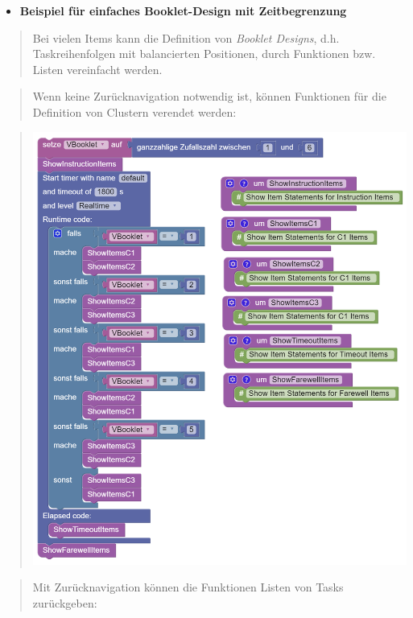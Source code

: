 \documentclass[
  letterpaper,
  DIV=11]{scrreprt}
\providecommand{\tightlist}{%
  \setlength{\itemsep}{0pt}\setlength{\parskip}{0pt}}\usepackage{longtable,booktabs,array}
\begin{document}
\begin{tcolorbox}
\begin{itemize}
\tightlist
\item
  \textbf{Beispiel für einfaches Booklet-Design mit Zeitbegrenzung}
\end{itemize}

\begin{quote}
Bei vielen Items kann die Definition von \emph{Booklet Designs}, d.h.
Taskreihenfolgen mit balancierten Positionen, durch Funktionen bzw.
Listen vereinfacht werden.
\end{quote}

\begin{quote}
Wenn keine Zurücknavigation notwendig ist, können Funktionen für die
Definition von Clustern verendet werden:
\end{quote}

\begin{quote}
\includegraphics[width=5.20833in,height=\textheight]{img/screenshot-show-items-example-booklet-design-example-functions-01-DEU.png}
\end{quote}

\begin{quote}
Mit Zurücknavigation können die Funktionen Listen von Tasks zurückgeben:
\end{quote}


\end{tcolorbox}
\end{document}
